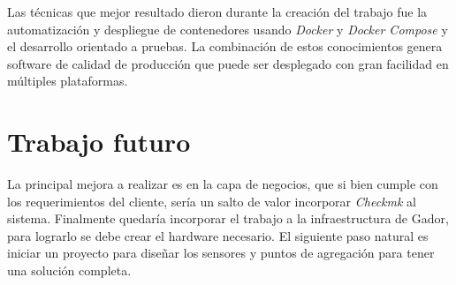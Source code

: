 Las técnicas que mejor resultado dieron durante la creación del trabajo fue la automatización y despliegue de contenedores usando \emph{Docker} y \emph{Docker Compose} y el desarrollo orientado a pruebas.
La combinación de estos conocimientos genera software de calidad de producción que puede ser desplegado con gran facilidad en múltiples plataformas.

\section{Trabajo futuro}

La principal mejora a realizar es en la capa de negocios, que si bien cumple con los requerimientos del cliente, sería un salto de valor incorporar \emph{Checkmk} al sistema.
Finalmente quedaría incorporar el trabajo a la infraestructura de Gador, para lograrlo se debe crear el hardware necesario.
El siguiente paso natural es iniciar un proyecto para diseñar los sensores y puntos de agregación para tener una solución completa.